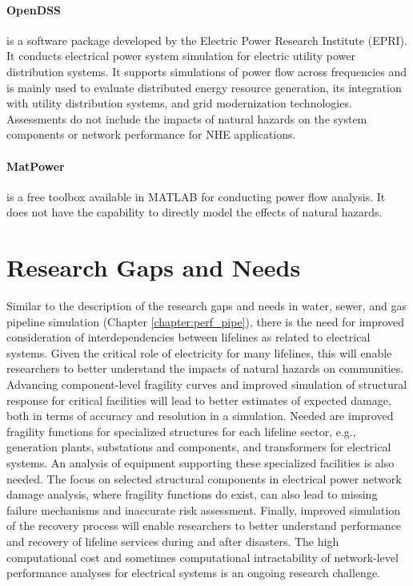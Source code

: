 \paragraph{OpenDSS} 
 is a software package developed by the Electric Power Research Institute (EPRI). It conducts electrical power system simulation for electric utility power distribution systems. It supports simulations of power flow across frequencies and is mainly used to evaluate distributed energy resource generation, its integration with utility distribution systems, and grid modernization technologies. Assessments do not include the impacts of natural hazards on the system components or network performance for NHE applications.

\paragraph{MatPower}  \citep{zimmerman2011matpower} is a free toolbox available in MATLAB for conducting power flow analysis. It does not have the capability to directly model the effects of natural hazards.

\section{Research Gaps and Needs}
\label{sec:perf_power_gaps}

Similar to the description of the research gaps and needs in water, sewer, and gas pipeline simulation (Chapter \ref{chapter:perf_pipe}), there is the need for improved consideration of interdependencies between lifelines as related to electrical systems. Given the critical role of electricity for many lifelines, this will enable researchers to better understand the impacts of natural hazards on communities. Advancing component-level fragility curves and improved simulation of structural response for critical facilities will lead to better estimates of expected damage, both in terms of accuracy and resolution in a simulation. Needed are improved fragility functions for specialized structures for each lifeline sector, e.g., generation plants, substations and components, and transformers for electrical systems. An analysis of equipment supporting these specialized facilities is also needed. The focus on selected structural components in electrical power network damage analysis, where fragility functions do exist, can also lead to missing failure mechanisms and inaccurate risk assessment. Finally, improved simulation of the recovery process will enable researchers to better understand performance and recovery of lifeline services during and after disasters. The high computational cost and sometimes computational intractability of network-level performance analyses for electrical systems is an ongoing research challenge.
